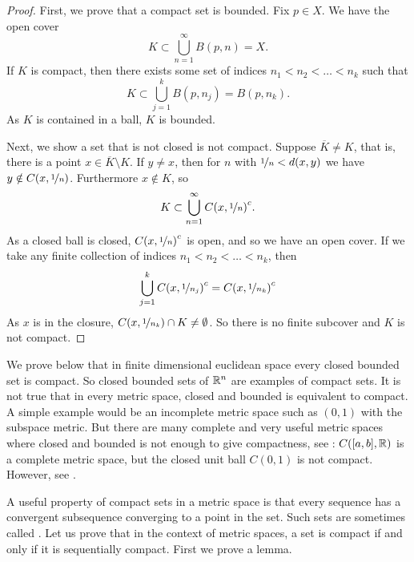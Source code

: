 \begin{proof}
First, we prove that a compact set is bounded.
Fix $p \in X$.  We have the open cover
\begin{equation*}
K \subset \bigcup_{n=1}^\infty B(p,n) = X .
\end{equation*}
If $K$ is compact, then there exists some set of indices
$n_1 < n_2 < \ldots < n_k$ such that
\begin{equation*}
K \subset \bigcup_{j=1}^k B(p,n_j) = B(p,n_k) .
\end{equation*}
As $K$ is contained in a ball, $K$ is bounded.

Next, we show a set that is not closed is not compact.  Suppose 
$\overline{K} \not= K$, that is, there is a point $x \in \overline{K}
\setminus K$.
If $y \not= x$, then for $n$
with $\nicefrac{1}{n} < d(x,y)$ we have
$y \notin C(x,\nicefrac{1}{n})$. Furthermore $x \notin K$, so
\begin{equation*}
K \subset \bigcup_{n=1}^\infty {C(x,\nicefrac{1}{n})}^c .
\end{equation*}
As a closed ball is closed, ${C(x,\nicefrac{1}{n})}^c$ is open, and
so we have an open cover.
If we take any
finite collection of indices $n_1 < n_2 < \ldots < n_k$, then 
\begin{equation*}
\bigcup_{j=1}^k {C(x,\nicefrac{1}{n_j})}^c 
=
{C(x,\nicefrac{1}{n_k})}^c 
\end{equation*}
As $x$ is in the closure,
$C(x,\nicefrac{1}{n_k}) \cap K \not= \emptyset$.  So there is no
finite subcover and $K$ is not compact.
\end{proof}

We prove below that 
in finite dimensional euclidean space
every closed bounded set is compact.
So closed bounded sets
of ${\mathbb{R}}^n$ are examples of compact sets.
It is not true that in every metric space, closed and bounded is equivalent
to compact.  A simple example would be an incomplete metric space such as
$(0,1)$ with the subspace metric.
But there are many complete and very useful metric spaces where closed and bounded is not
enough to give compactness, see
: $C([a,b],{\mathbb{R}})$ is a complete metric
space, but the closed unit ball $C(0,1)$ is not compact.  However, see
.

A useful property of compact sets in a metric space is that every
sequence has a convergent subsequence converging to a point in the set.
Such sets are sometimes called
\emph{}.  Let us prove that in the
context of metric spaces, a set is compact if and only if it is sequentially
compact.
First we prove a lemma.

